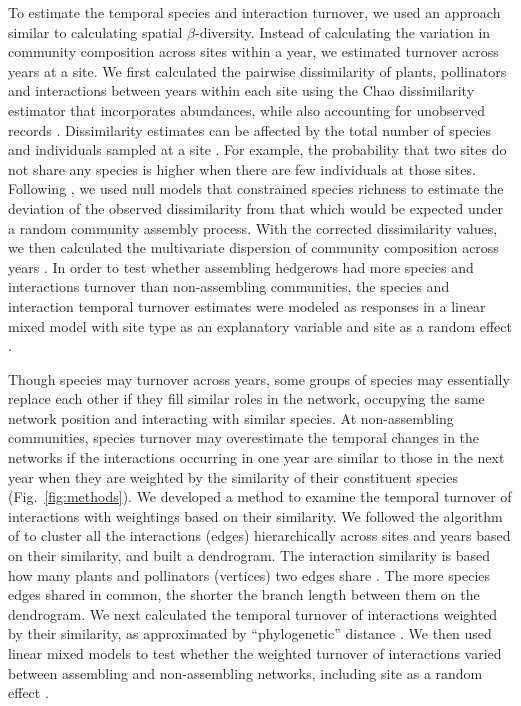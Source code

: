 \documentclass[12pt]{article}
\begin{document}
To estimate the temporal species and interaction turnover, we used an
approach similar to calculating spatial $\beta$-diversity. Instead of
calculating the variation in community composition across sites within
a year, we estimated turnover across years at a site. We first
calculated the pairwise dissimilarity of plants, pollinators and
interactions between years within each site using the Chao
dissimilarity estimator that incorporates abundances, while also
accounting for unobserved records \citep{chao-2005-148}. Dissimilarity
estimates can be affected by the total number of species and
individuals sampled at a site \citep[e.g.,][]{ponisio2015farm}. For
example, the probability that two sites do not share any species is
higher when there are few individuals at those sites. Following
\cite{ponisio2015farm}, we used null models that constrained species
richness to estimate the deviation of the observed dissimilarity from
that which would be expected under a random community assembly
process. With the corrected dissimilarity values, we then calculated
the multivariate dispersion of community composition across years
\citep{anderson-2011-19}. In order to test whether assembling
hedgerows had more species and interactions turnover than
non-assembling communities, the species and interaction temporal
turnover estimates were modeled as responses in a linear mixed model
with site type as an explanatory variable and site as a random effect
\citep{lme4, lmetest}.

Though species may turnover across years, some groups of species may
essentially replace each other if they fill similar roles in the
network, occupying the same network position and interacting with
similar species. At non-assembling communities, species turnover may
overestimate the temporal changes in the networks if the interactions
occurring in one year are similar to those in the next year when they
are weighted by the similarity of their constituent species
(Fig.~\ref{fig:methods}). We developed a method to examine the
temporal turnover of interactions with weightings based on their
similarity. We followed the algorithm of \cite{ahn2010link} to cluster
all the interactions (edges) hierarchically across sites and years
based on their similarity, and built a dendrogram. The interaction
similarity is based how many plants and pollinators (vertices) two
edges share \citep{ahn2010link, kalinka2011linkcomm}. The more species
edges shared in common, the shorter the branch length between them on
the dendrogram.  We next calculated the temporal turnover of
interactions weighted by their similarity, as approximated by
``phylogenetic'' distance \citep{graham2008phylogenetic,
  picante-2010-1463}. We then used linear mixed models to test whether
the weighted turnover of interactions varied between assembling and
non-assembling networks, including site as a random effect
\citep{lme4, lmetest}.
\end{document}
